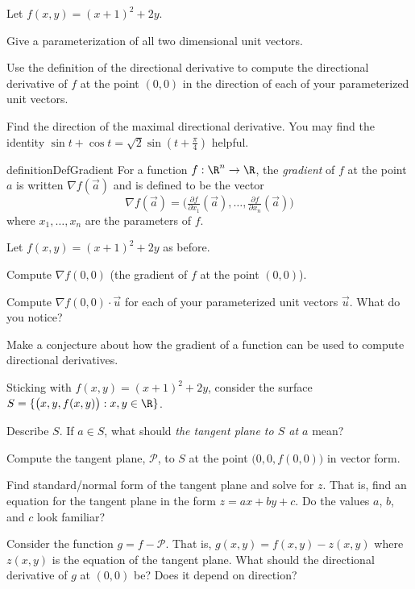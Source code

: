\begin{question}
	Let $f(x,y) = (x+1)^2+2y$.
	\begin{parts}
		\item Give a parameterization of all two dimensional unit vectors.
		\item Use the definition of the directional derivative to compute
			the directional derivative of $f$ at the point $(0,0)$ in the
			direction of each of your parameterized unit vectors.
		\item Find the direction of the maximal directional derivative.  You
			may find the identity $\sin t+\cos t = \sqrt{2}\sin(t+\tfrac{\pi}{4})$
			helpful.
	\end{parts}
\end{question}


\begin{restatable*}[Gradient]{definition}{DefGradient}
	For a function $f:\R^n\to\R$, the \emph{gradient} of $f$ at the point $a$ is
	written $\nabla f(\vec a)$ and is defined to be the vector
	\[
		\nabla f(\vec a) = \Big(\tfrac{\partial f}{\partial x_1}(\vec a),
		\ldots, \tfrac{\partial f}{\partial x_n}(\vec a) \Big)
	\]
		where $x_1,\ldots, x_n$ are the parameters of $f$.
\end{restatable*}


\begin{question}
	Let $f(x,y) = (x+1)^2+2y$ as before.
	\begin{parts}
		\item Compute $\nabla f(0,0)$ (the gradient of $f$ at the point $(0,0)$).
		\item Compute $\nabla f(0,0)\cdot \vec u$ for each of your parameterized unit vectors $\vec u$.
			What do you notice?
		\item Make a conjecture about how the gradient of a function can be used to compute directional derivatives.
	\end{parts}
\end{question}
\begin{question}
	Sticking with $f(x,y) = (x+1)^2+2y$, consider the surface $S=\{\big(x,y,f(x,y)\big):x,y\in\R\}$.
	\begin{parts}
		\item Describe $S$.  If $a\in S$, what should \emph{the tangent plane to $S$ at $a$} mean?
		\item Compute the tangent plane, $\mathcal P$, to $S$ at the point $\big(0,0,f(0,0)\big)$ in vector form.
		\item Find standard/normal form of the tangent plane and solve for $z$.  That is,
			find an equation for the tangent plane in the form $z=ax+by+c$.  Do the values $a$, $b$, and
			$c$ look familiar?
		\item Consider the function $g=f-\mathcal P$.  That is, $g(x,y)=f(x,y)-z(x,y)$ where $z(x,y)$ is the
			equation of the tangent plane.  What should the directional derivative of $g$ at $(0,0)$ be?
			Does it depend on direction?
	\end{parts}
\end{question}

